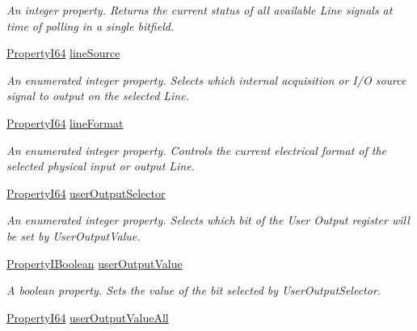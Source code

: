 \begin{DoxyCompactItemize}
\begin{DoxyCompactList}\small\item\em An integer property. Returns the current status of all available Line signals at time of polling in a single bitfield. \end{DoxyCompactList}\item 
\hyperlink{group___common_interface_ga81749b2696755513663492664a18a893}{Property\+I64} \hyperlink{classmv_i_m_p_a_c_t_1_1acquire_1_1_gen_i_cam_1_1_digital_i_o_control_abf9678823e6ff4071d5fdf3fa0c0a6a6}{line\+Source}
\begin{DoxyCompactList}\small\item\em An enumerated integer property. Selects which internal acquisition or I/\+O source signal to output on the selected Line. \end{DoxyCompactList}\item 
\hyperlink{group___common_interface_ga81749b2696755513663492664a18a893}{Property\+I64} \hyperlink{classmv_i_m_p_a_c_t_1_1acquire_1_1_gen_i_cam_1_1_digital_i_o_control_aefba4c332122a43b6c713a9eb72b3cd6}{line\+Format}
\begin{DoxyCompactList}\small\item\em An enumerated integer property. Controls the current electrical format of the selected physical input or output Line. \end{DoxyCompactList}\item 
\hyperlink{group___common_interface_ga81749b2696755513663492664a18a893}{Property\+I64} \hyperlink{classmv_i_m_p_a_c_t_1_1acquire_1_1_gen_i_cam_1_1_digital_i_o_control_a9d77f4a5ce746a4db6d50ca6d3f72c62}{user\+Output\+Selector}
\begin{DoxyCompactList}\small\item\em An enumerated integer property. Selects which bit of the User Output register will be set by User\+Output\+Value. \end{DoxyCompactList}\item 
\hyperlink{group___common_interface_ga44f9437e24b21b6c93da9039ec6786aa}{Property\+I\+Boolean} \hyperlink{classmv_i_m_p_a_c_t_1_1acquire_1_1_gen_i_cam_1_1_digital_i_o_control_a061e414fc5254821a2bd512ae7c7e4af}{user\+Output\+Value}
\begin{DoxyCompactList}\small\item\em A boolean property. Sets the value of the bit selected by User\+Output\+Selector. \end{DoxyCompactList}\item 
\hyperlink{group___common_interface_ga81749b2696755513663492664a18a893}{Property\+I64} \hyperlink{classmv_i_m_p_a_c_t_1_1acquire_1_1_gen_i_cam_1_1_digital_i_o_control_a2b61661cdb50161e17bb472614610506}{user\+Output\+Value\+All}

\end{DoxyCompactItemize}
